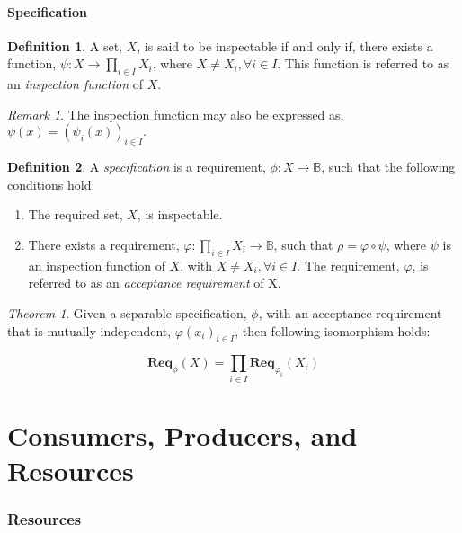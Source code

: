 \documentclass{article}
\theoremstyle{definition}
\newtheorem{definition}{Definition}[section]
\theoremstyle{remark}
\newtheorem*{remark}{Remark}
\theoremstyle{theorem}
\newtheorem*{theorem}{Theorem}
\theoremstyle{definition}
\newcommand{\func}[3]{#1:#2\rightarrow#3}
\newcommand{\reqfunc}[2]{#1:#2\rightarrow\mathbb{B}}
\newcommand{\reqop}[2]{\mathbf{Req}_{#1}(#2)}
\begin{document}
		\subsection{Specification}
		
		\begin{definition}
			A set, $X$, is said to be inspectable if and only if, there exists a function, $\func{\psi}{X}{\prod_{i \in I}{X_{i}}}$, where $X \ne X_{i}, \forall i \in I$. This function is referred to as an \emph{inspection function} of $X$.
		\end{definition}
	
		\begin{remark}
			The inspection function may also be expressed as, $\psi(x) = (\psi_{i}(x))_{i \in I}.$ 
		\end{remark}
		
		\begin{definition}
			A \emph{specification} is a requirement, $\reqfunc{\phi}{X}$, such that the following conditions hold:
			
			\begin{enumerate}
				\item The required set, $X$, is inspectable.
				
				\item There exists a requirement, $\reqfunc{\varphi}{\prod_{i \in I}{X_{i}}}$, such that $\rho = \varphi \circ \psi$, where $\psi$ is an inspection function of $X$, with $X \ne X_{i}, \forall i \in I$. The requirement, $\varphi$, is referred to as an \emph{acceptance requirement} of X.
			\end{enumerate}
		
		\end{definition}
	
		\begin{theorem}
			Given a separable specification, $\phi$, with an acceptance requirement that is mutually independent,
            $\varphi(x_i)_{i \in I}$, then following isomorphism holds:
			
			\[
			\reqop{\phi}{X} = \prod_{i \in I}\reqop{\varphi_{i}}{X_{i}}
			\] 
		\end{theorem}
			
	\part{Consumers, Producers, and Resources}
	
	\section{Resources}
	
\end{document}

